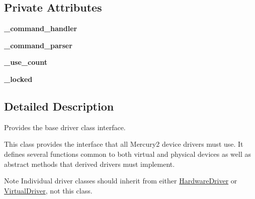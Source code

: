 \subsection*{Private Attributes}
\begin{DoxyCompactItemize}
\item 
\hypertarget{classhwm_1_1hardware_1_1devices_1_1drivers_1_1driver_1_1_driver_ac7ee7e0a583514c5f30914948dfdacfe}{{\bfseries \-\_\-command\-\_\-handler}}\label{classhwm_1_1hardware_1_1devices_1_1drivers_1_1driver_1_1_driver_ac7ee7e0a583514c5f30914948dfdacfe}

\item 
\hypertarget{classhwm_1_1hardware_1_1devices_1_1drivers_1_1driver_1_1_driver_aeeff7ce16d9b597f13fce56b21587be5}{{\bfseries \-\_\-command\-\_\-parser}}\label{classhwm_1_1hardware_1_1devices_1_1drivers_1_1driver_1_1_driver_aeeff7ce16d9b597f13fce56b21587be5}

\item 
\hypertarget{classhwm_1_1hardware_1_1devices_1_1drivers_1_1driver_1_1_driver_a9a56c369223e99e5a63ff380b57701ff}{{\bfseries \-\_\-use\-\_\-count}}\label{classhwm_1_1hardware_1_1devices_1_1drivers_1_1driver_1_1_driver_a9a56c369223e99e5a63ff380b57701ff}

\item 
\hypertarget{classhwm_1_1hardware_1_1devices_1_1drivers_1_1driver_1_1_driver_aeb62fd124c64f458c1aeb0cd83c65717}{{\bfseries \-\_\-locked}}\label{classhwm_1_1hardware_1_1devices_1_1drivers_1_1driver_1_1_driver_aeb62fd124c64f458c1aeb0cd83c65717}

\end{DoxyCompactItemize}


\subsection{Detailed Description}
Provides the base driver class interface. 

This class provides the interface that all Mercury2 device drivers must use. It defines several functions common to both virtual and physical devices as well as abstract methods that derived drivers must implement.

\begin{DoxyNote}{Note}
Individual driver classes should inherit from either \hyperlink{classhwm_1_1hardware_1_1devices_1_1drivers_1_1driver_1_1_hardware_driver}{Hardware\-Driver} or \hyperlink{classhwm_1_1hardware_1_1devices_1_1drivers_1_1driver_1_1_virtual_driver}{Virtual\-Driver}, not this class. 
\end{DoxyNote}



